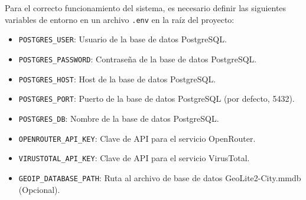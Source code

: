 \documentclass[letterpaper, 12pt]{article}
\begin{document}
Para el correcto funcionamiento del sistema, es necesario definir las siguientes variables de entorno en un archivo \texttt{.env} en la raíz del proyecto:

\begin{itemize}
    \item \texttt{POSTGRES\_USER}: Usuario de la base de datos PostgreSQL\@{}.
    \item \texttt{POSTGRES\_PASSWORD}: Contraseña de la base de datos PostgreSQL\@{}.
    \item \texttt{POSTGRES\_HOST}: Host de la base de datos PostgreSQL\@{}.
    \item \texttt{POSTGRES\_PORT}: Puerto de la base de datos PostgreSQL (por defecto, 5432).
    \item \texttt{POSTGRES\_DB}: Nombre de la base de datos PostgreSQL\@{}.
    \item \texttt{OPENROUTER\_API\_KEY}: Clave de API para el servicio OpenRouter.
    \item \texttt{VIRUSTOTAL\_API\_KEY}: Clave de API para el servicio VirusTotal.
    \item \texttt{GEOIP\_DATABASE\_PATH}: Ruta al archivo de base de datos GeoLite2-City.mmdb (Opcional).
\end{itemize}
\end{document}
